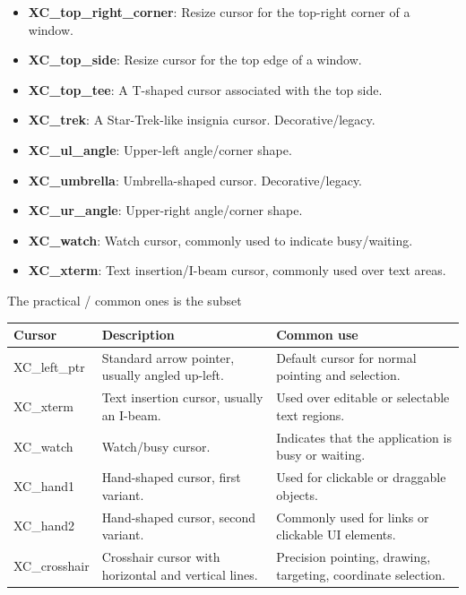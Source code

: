 \documentclass{report}
\begin{document}
\begin{itemize}
\begin{itemize}
                    \item \textbf{XC\_top\_right\_corner}:	Resize cursor for the top-right corner of a window.
                    \item \textbf{XC\_top\_side}:	Resize cursor for the top edge of a window.
                    \item \textbf{XC\_top\_tee}:	A T-shaped cursor associated with the top side.
                    \item \textbf{XC\_trek}:	A Star-Trek-like insignia cursor. Decorative/legacy.
                    \item \textbf{XC\_ul\_angle}:	Upper-left angle/corner shape.
                    \item \textbf{XC\_umbrella}:	Umbrella-shaped cursor. Decorative/legacy.
                    \item \textbf{XC\_ur\_angle}:	Upper-right angle/corner shape.
                    \item \textbf{XC\_watch}:	Watch cursor, commonly used to indicate busy/waiting.
                    \item \textbf{XC\_xterm}:	Text insertion/I-beam cursor, commonly used over text areas.
                \end{itemize}
                The practical / common ones is the subset
                \begin{center}
                    \begin{tabularx}{\textwidth}{@{}lXX@{}}
                        \toprule
                        \textbf{Cursor}&	\textbf{Description}&	\textbf{Common use} \\
                        \midrule
                        XC\_left\_ptr	&Standard arrow pointer, usually angled up-left.	&Default cursor for normal pointing and selection.\\[2ex]
                        XC\_xterm	&Text insertion cursor, usually an I-beam.	&Used over editable or selectable text regions.\\[2ex]
                        XC\_watch	&Watch/busy cursor.	&Indicates that the application is busy or waiting.\\[2ex]
                        XC\_hand1	&Hand-shaped cursor, first variant.	&Used for clickable or draggable objects.\\[2ex]
                        XC\_hand2	&Hand-shaped cursor, second variant.	&Commonly used for links or clickable UI elements.\\[2ex]
                        XC\_crosshair	&Crosshair cursor with horizontal and vertical lines.	&Precision pointing, drawing, targeting, coordinate selection.\\[2ex]

\end{tabularx}
\end{center}
\end{itemize}
\end{document}
